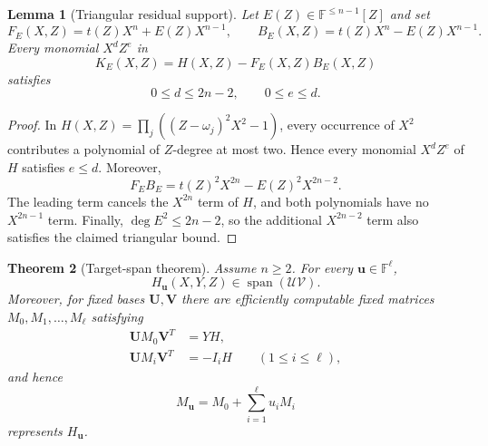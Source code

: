 \documentclass[11pt]{article}
\newtheorem{theorem}{Theorem}[section]
\newtheorem{lemma}[theorem]{Lemma}
\theoremstyle{definition}
\newcommand{\F}{\mathbb F}
\newcommand{\cU}{\mathcal U}
\newcommand{\cV}{\mathcal V}
\newcommand{\Span}{\operatorname{span}}
\begin{document}
\begin{lemma}[Triangular residual support]
\label{lem:triangular-residual}
Let $E(Z)\in\F^{\le n-1}[Z]$ and set
\[
  F_E(X,Z)=t(Z)X^n+E(Z)X^{n-1},
  \qquad
  B_E(X,Z)=t(Z)X^n-E(Z)X^{n-1}.
\]
Every monomial $X^dZ^e$ in
\[
  K_E(X,Z)=H(X,Z)-F_E(X,Z)B_E(X,Z)
\]
satisfies
\[
  0\le d\le2n-2,
  \qquad
  0\le e\le d.
\]
\end{lemma}

\begin{proof}
In $H(X,Z)=\prod_j((Z-\omega_j)^2X^2-1)$, every occurrence of
$X^2$ contributes a polynomial of $Z$-degree at most two.  Hence every
monomial $X^dZ^e$ of $H$ satisfies $e\le d$.  Moreover,
\[
  F_EB_E=t(Z)^2X^{2n}-E(Z)^2X^{2n-2}.
\]
The leading term cancels the $X^{2n}$ term of $H$, and both polynomials have no
$X^{2n-1}$ term.  Finally, $\deg E^2\le2n-2$, so the additional
$X^{2n-2}$ term also satisfies the claimed triangular bound.
\end{proof}

\begin{theorem}[Target-span theorem]
\label{thm:fsp-target-span}
Assume $n\ge2$.  For every $\mathbf u\in\F^\ell$,
\[
  H_{\mathbf u}(X,Y,Z)\in\Span(\cU\cV).
\]
Moreover, for fixed bases $\mathbf U,\mathbf V$ there are efficiently
computable fixed matrices $M_0,M_1,\ldots,M_\ell$ satisfying
\begin{align}
  \mathbf U M_0\mathbf V^T&=YH,
  \label{eq:fsp-M0}\\
  \mathbf U M_i\mathbf V^T&=-I_iH
  \qquad(1\le i\le\ell),
  \label{eq:fsp-Mi}
\end{align}
and hence
\begin{equation}
  M_{\mathbf u}=M_0+\sum_{i=1}^{\ell}u_iM_i
  \label{eq:fsp-Mu}
\end{equation}
represents $H_{\mathbf u}$.
\end{theorem}
\end{document}
